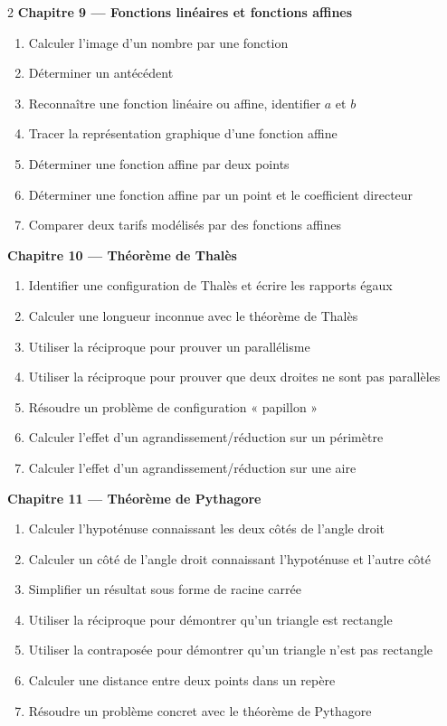\begin{multicols}{2}
\textbf{\normalsize\color{onbo}Chapitre 9 --- Fonctions linéaires et fonctions affines}
\begin{enumerate}[label=\arabic*.,itemsep=1pt,topsep=2pt,leftmargin=1.6em]
\item Calculer l'image d'un nombre par une fonction
\item Déterminer un antécédent
\item Reconnaître une fonction linéaire ou affine, identifier $a$ et $b$
\item Tracer la représentation graphique d'une fonction affine
\item Déterminer une fonction affine par deux points
\item Déterminer une fonction affine par un point et le coefficient directeur
\item Comparer deux tarifs modélisés par des fonctions affines
\end{enumerate}
\vspace{4pt}

\textbf{\normalsize\color{onbo}Chapitre 10 --- Théorème de Thalès}
\begin{enumerate}[label=\arabic*.,itemsep=1pt,topsep=2pt,leftmargin=1.6em]
\item Identifier une configuration de Thalès et écrire les rapports égaux
\item Calculer une longueur inconnue avec le théorème de Thalès
\item Utiliser la réciproque pour prouver un parallélisme
\item Utiliser la réciproque pour prouver que deux droites ne sont pas parallèles
\item Résoudre un problème de configuration « papillon »
\item Calculer l'effet d'un agrandissement/réduction sur un périmètre
\item Calculer l'effet d'un agrandissement/réduction sur une aire
\end{enumerate}
\vspace{4pt}

\textbf{\normalsize\color{onbo}Chapitre 11 --- Théorème de Pythagore}
\begin{enumerate}[label=\arabic*.,itemsep=1pt,topsep=2pt,leftmargin=1.6em]
\item Calculer l'hypoténuse connaissant les deux côtés de l'angle droit
\item Calculer un côté de l'angle droit connaissant l'hypoténuse et l'autre côté
\item Simplifier un résultat sous forme de racine carrée
\item Utiliser la réciproque pour démontrer qu'un triangle est rectangle
\item Utiliser la contraposée pour démontrer qu'un triangle n'est pas rectangle
\item Calculer une distance entre deux points dans un repère
\item Résoudre un problème concret avec le théorème de Pythagore
\end{enumerate}
\vspace{4pt}


\end{multicols}
